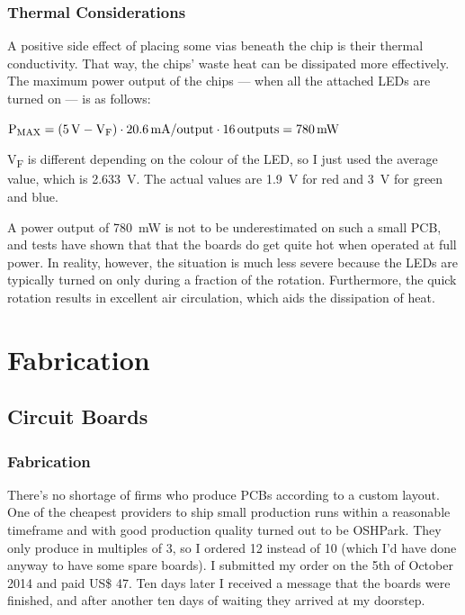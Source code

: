 \documentclass[a4paper, 11pt, titlepage]{report}
\newenvironment{ownmath}
{\vspace{2mm}\hspace{15pt}\begin{math}}
{\end{math}\vspace{2mm}}
\begin{document}
\subsection{Thermal Considerations}

A positive side effect of placing some vias beneath the chip is their thermal conductivity. That
way, the chips' waste heat can be dissipated more effectively. The maximum power output of the
chips --- when all the attached LEDs are turned on --- is as follows:

\begin{ownmath}
\textrm{P\textsubscript{MAX}} = (\SI{5}{\volt} - \textrm{V\textsubscript{F}}) \cdot
\SI{20.6}{\milli\ampere\per output} \cdot \SI{16}{outputs} = \SI{780}{\milli\watt}
\end{ownmath}

V\textsubscript{F} is different depending on the colour of the LED, so I just used the average
value, which is \SI{2.633}{\volt}. The actual values are \SI{1.9}{\volt} for red and \SI{3}{\volt}
for green and blue.

A power output of \SI{780}{\milli\watt} is not to be underestimated on such a small PCB, and tests
have shown that that the boards do get quite hot when operated at full power. In reality, however,
the situation is much less severe because the LEDs are typically turned on only during a fraction
of the rotation. Furthermore, the quick rotation results in excellent air circulation, which aids
the dissipation of heat.









\chapter{Fabrication}

\section{Circuit Boards}

\subsection{Fabrication}

There's no shortage of firms who produce PCBs according to a custom layout. One of the cheapest
providers to ship small production runs within a reasonable timeframe and with good production
quality turned out to be OSHPark. They only produce in multiples of 3, so I ordered 12 instead of
10 (which I'd have done anyway to have some spare boards). I submitted my order on the 5th of
October 2014 and paid US\$ 47. Ten days later I received a message that the boards were finished,
and after another ten days of waiting they arrived at my doorstep.
\end{document}
